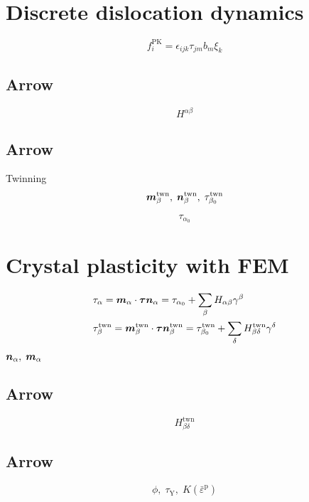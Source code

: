 \documentclass[11pt]{article}
\begin{document}
\section*{Discrete dislocation dynamics}
\begin{displaymath}
f^\mathrm{PK}_i = \epsilon_{ijk}\tau_{jm}b_m\xi_k
\end{displaymath}

\subsection*{Arrow}
\begin{displaymath}
H^{\alpha\beta}
\end{displaymath}

\subsection*{Arrow}
Twinning
\begin{displaymath}
\mbox{\boldmath$ m$}^\mathrm{twn}_\beta,\;\mbox{\boldmath$ n$}^\mathrm{twn}_\beta,\;\tau_{\beta_0}^\mathrm{twn}
\end{displaymath}

\begin{displaymath}
\tau_{\alpha_0}
\end{displaymath}

\section*{Crystal plasticity with FEM}
\begin{align*}
&\tau_\alpha = \mbox{\boldmath$ m$}_\alpha\cdot\mbox{\boldmath$\tau$}\mbox{\boldmath$ n$}_\alpha = \tau_{\alpha_0} + \sum_{\beta}H_{\alpha\beta}\gamma^\beta\\
&\tau^\mathrm{twn}_\beta = \mbox{\boldmath$ m$}^\mathrm{twn}_\beta\cdot\mbox{\boldmath$\tau$}\mbox{\boldmath$ n$}^\mathrm{twn}_\beta = \tau^\mathrm{twn}_{\beta_0} + \sum_{\delta}H^\mathrm{twn}_{\beta\delta}\gamma^\delta
\end{align*}

$\mbox{\boldmath$ n$}_\alpha,\;\mbox{\boldmath$ m$}_\alpha$

\subsection*{Arrow}
\begin{displaymath}
H^\mathrm{twn}_{\beta\delta}
\end{displaymath}

\subsection*{Arrow}
\begin{displaymath}
\phi,\;\tau_\mathrm{Y},\;K(\bar{\varepsilon}^\mathrm{p})
\end{displaymath}
\end{document}
